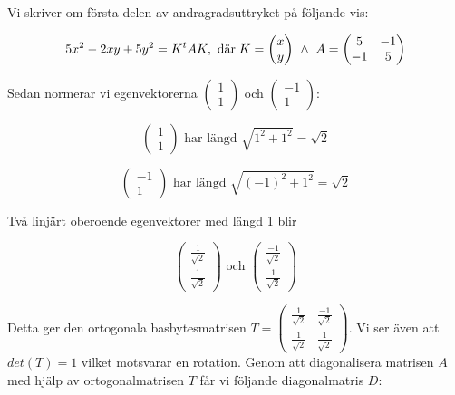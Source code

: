 \documentclass{article}
\begin{document}
\newpage

Vi skriver om första delen av andragradsuttryket på följande vis:

$$
5x^2-2xy+5y^2=K^{t}AK,
\text{  där}
\;
K=
\begin{pmatrix}
    x \\
    y
\end{pmatrix}
\ \wedge \ 
A=
\begin{pmatrix}
    5 & -1 \\
    -1 & 5
\end{pmatrix}
$$

\vskip 0.3cm

Sedan normerar vi egenvektorerna $\begin{pmatrix} 1 \\ 1 \end{pmatrix}$ och $\begin{pmatrix} -1 \\ 1 \end{pmatrix}$:

\vskip 0.3cm

$$
\begin{pmatrix}
    1 \\ 
    1
\end{pmatrix}
\text{ har längd }
\sqrt{1^2+1^2}
=
\sqrt{2}
$$

$$
\begin{pmatrix}
    -1 \\ 
    1
\end{pmatrix}
\text{ har längd }
\sqrt{(-1)^2+1^2}
=
\sqrt{2}
$$

\vskip 0.3cm

Två linjärt oberoende egenvektorer med längd 1 blir 

$$
\begin{pmatrix}
    \frac{1}{\sqrt{2}} \\
    \frac{1}{\sqrt{2}}
\end{pmatrix}
\text{ och }
\begin{pmatrix}
    \frac{-1}{\sqrt{2}} \\
    \frac{1}{\sqrt{2}}
\end{pmatrix}
$$

\vskip 0.3cm

Detta ger den ortogonala basbytesmatrisen $T=\begin{pmatrix} \frac{1}{\sqrt{2}} & \frac{-1}{\sqrt{2}} \\ \frac{1}{\sqrt{2}} & \frac{1}{\sqrt{2}} \end{pmatrix}$. Vi ser även att $det(T)=1$ vilket motsvarar en rotation. Genom att diagonalisera matrisen $A$ med hjälp av ortogonalmatrisen $T$ får vi följande diagonalmatris $D$:
\end{document}
